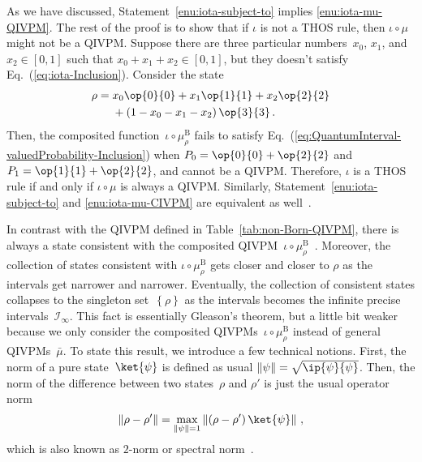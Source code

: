 \documentclass[english,reprint, aps, prl,superscriptaddress, showpacs,
showkeys, longbibliography, amsmath, amssymb, floatfix]{revtex4-1}
\theoremstyle{plain}
\theoremstyle{definition}
\newcommand{\proj}[1]{\op{#1}{#1}}
\begin{document}
As we have discussed, Statement~\ref{enu:iota-subject-to} implies
\ref{enu:iota-mu-QIVPM}. The rest of the proof is to show that if
$\iota$ is not a THOS rule, then $\iota\circ\mu$ might not be a
QIVPM. Suppose there are three particular numbers~$x_{0}$, $x_{1}$,
and $x_{2}\in\left[0,1\right]$ such that $x_{0}+x_{1}+x_{2}\in\left[0,1\right]$,
but they doesn't satisfy Eq.~(\ref{eq:iota-Inclusion}). Consider
the state 
\begin{equation}
\begin{aligned}\rho={} & x_{0}\proj{0}+x_{1}\proj{1}+x_{2}\proj{2}\\
 & +\left(1-x_{0}-x_{1}-x_{2}\right)\proj{3}\,.
\end{aligned}
\end{equation}
Then, the composited function~$\iota\circ\mu_{\rho}^{\mathrm{\mathrm{B}}}$
fails to satisfy Eq.~(\ref{eq:QuantumInterval-valuedProbability-Inclusion})
when $P_{0}=\proj{0}+\proj{2}$ and $P_{1}=\proj{1}+\proj{2}$, and
cannot be a QIVPM. Therefore, $\iota$ is a THOS rule if and only
if $\iota\circ\mu$ is always a QIVPM. Similarly, Statement~\ref{enu:iota-subject-to}
and \ref{enu:iota-mu-CIVPM} are equivalent as well~\citep{HOSTunpublished}.

In contrast with the QIVPM defined in Table~\ref{tab:non-Born-QIVPM},
there is always a state consistent with the composited QIVPM~$\iota\circ\mu_{\rho}^{\mathrm{B}}$~\citep{HOSTunpublished}.
Moreover, the collection of states consistent with $\iota\circ\mu_{\rho}^{\mathrm{B}}$
gets closer and closer to $\rho$ as the intervals get narrower and
narrower. Eventually, the collection of consistent states collapses
to the singleton set~$\left\{ \rho\right\} $ as the intervals becomes
the infinite precise intervals~$\mathscr{I}_{\infty}$. This fact
is essentially Gleason's theorem, but a little bit weaker because
we only consider the composited QIVPMs~$\iota\circ\mu_{\rho}^{\mathrm{B}}$
instead of general QIVPMs~$\bar{\mu}$. To state this result, we
introduce a few technical notions. First, the norm of a pure state~$\ket{\psi}$
is defined as usual $\left\Vert \psi\right\Vert =\sqrt{\ip{\psi}{\psi}}$.
Then, the norm of the difference between two states~$\rho$ and $\rho'$
is just the usual operator norm
\begin{equation}
\left\Vert \rho-\rho'\right\Vert =\max_{\left\Vert \psi\right\Vert =1}\left\Vert \left(\rho-\rho'\right)\ket{\psi}\right\Vert \,,
\end{equation}
which is also known as $2$-norm or spectral norm~\citep{RobertsVarberg1973,peres1995quantum,GolubVanLoan1996,Foucart2012}.
\end{document}
